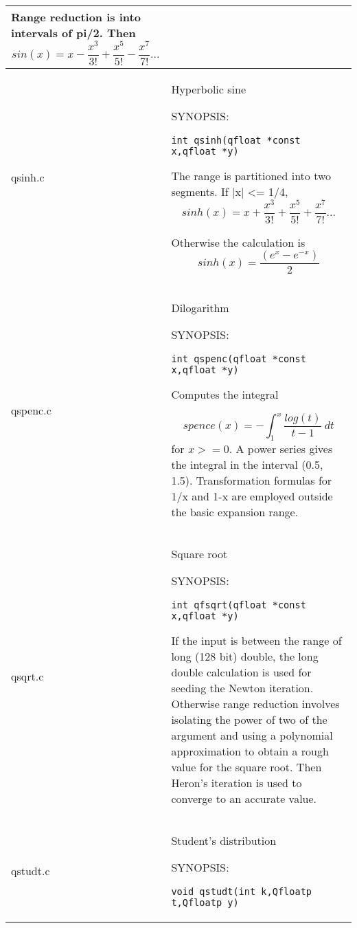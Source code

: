 \documentclass[10pt,a4paper,x11names]{memoir} %
\begin{document}
\begin{longtable}{|p{1.5cm}|p{11.5cm}|}
	Range reduction is into intervals of pi/2.
	Then
	$$ sin(x) = x - \frac{x^3}{3!}+\frac{x^5}{5!}-\frac{x^7}{7!} ...$$
	\\\hline
	
	qsinh.c& Hyperbolic sine
	
	{\footnotesize SYNOPSIS:}\vspace{-0.2cm}
	\begin{lstlisting}[numbers=none]
		int qsinh(qfloat *const x,qfloat *y)
	\end{lstlisting}\vspace{-0.2cm}
	The range is partitioned into two segments.  If |x| <= 1/4,
	$$ sinh(x)=x+\frac{x^3}{3!}+\frac{x^5}{5!}+\frac{x^7}{7!} ...$$
	
	Otherwise the calculation is $$sinh(x) = \frac{( e^{x} - e^{-x} )}{2}$$
	
	\\\hline
	qspenc.c& Dilogarithm
	
	{\footnotesize SYNOPSIS:}\vspace{-0.2cm}
	\begin{lstlisting}[numbers=none]
		int qspenc(qfloat *const x,qfloat *y)
	\end{lstlisting}\vspace{-0.2cm}
	
	Computes the integral
	
	$$ spence(x)= - \int_{1}^{x} \frac{log(t)}{t-1} \ dt$$
	for $x >= 0$.  A power series gives the integral in
	the interval (0.5, 1.5).  Transformation formulas for 1/x
	and 1-x are employed outside the basic expansion range.
	\\\hline
	qsqrt.c& Square root
	
	{\footnotesize SYNOPSIS:}\vspace{-0.2cm}
	\begin{lstlisting}[numbers=none]
		int qfsqrt(qfloat *const x,qfloat *y)
	\end{lstlisting}\vspace{-0.2cm}
	
	If the input is between the range of long (128 bit)  double, the long double calculation is used for seeding
	the Newton iteration. Otherwise  range reduction involves isolating the power of two of the
	argument and using a polynomial approximation to obtain
	a rough value for the square root.  Then Heron's iteration
	is used to converge to an accurate value.
	\\\hline
	qstudt.c& Student's distribution
	
	{\footnotesize SYNOPSIS:}\vspace{-0.2cm}
	\begin{lstlisting}[numbers=none]
		void qstudt(int k,Qfloatp t,Qfloatp y)
	\end{lstlisting}\vspace{-0.2cm}
	

\end{longtable}
\end{document}
